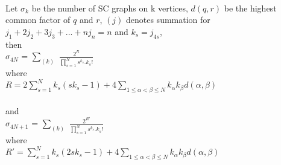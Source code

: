 \documentclass[12pt,conference]{IEEEtran}
\begin{document}
\paragraph*{} Let $\sigma_{k}$ be the number of SC graphs on k vertices,
$d(q,r)$ be the highest common factor of $q$ and $r$,
$(j)$ denotes summation for \\
$j_{1}+2j_{2}+3j_{3}+...+nj_{n} = n $ and $k_{s}=j_{4s}$,\\
then \\
\hspace*{1cm} $\sigma_{4N}$ = $\sum_{(k)}$ $\frac{2^{R}}{\prod_{s=1}^{N} s^{k_{s}}.k_{s}!}$ \\
where \\
 $R = 2\sum_{s=1}^{N}k_{s}(s k_{s}-1)+ 4\sum_{1\leq\alpha<\beta\leq N} k_{\alpha}k_{\beta} d(\alpha,\beta) $\\ \\
and \\
\hspace*{1cm} $\sigma_{4N+1}$ = $\sum_{(k)}$ $\frac{2^{R'}}{\prod_{s=1}^{N} s^{k_{s}}.k_{s}!}$ \\
where \\ 
$R' = \sum_{s=1}^{N}k_{s}(2s k_{s}-1)+ 4\sum_{1\leq\alpha<\beta\leq N} k_{\alpha}k_{\beta} d(\alpha,\beta) $\\
\end{document}
